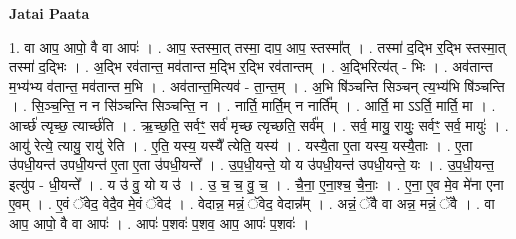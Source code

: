 \documentclass[17pt]{extarticle}
\begin{document}
\textbf{Jatai Paata} \newline

1. वा आप॒ आपो॒ वै वा आपः॑ । . आप॒ स्तस्मा॒त् तस्मा॒ दाप॒ आप॒ स्तस्मा᳚त् । . तस्मा॑ द॒द्भि र॒द्भि स्तस्मा॒त् तस्मा॑ द॒द्भिः । . अ॒द्भि रव॑तान्त॒ मव॑तान्त म॒द्भि र॒द्भि रव॑तान्तम् । . अ॒द्भिरित्य॑त् - भिः । . अव॑तान्त म॒भ्य॑भ्य व॑तान्त॒ मव॑तान्त म॒भि । . अव॑तान्त॒मित्यव॑ - ता॒न्त॒म् । . अ॒भि षि॑ञ्चन्ति सिञ्चन् त्य॒भ्य॑भि षि॑ञ्चन्ति । . सि॒ञ्च॒न्ति॒ न न सि॑ञ्चन्ति सिञ्चन्ति॒ न । . नार्ति॒ मार्ति॒म् न नार्ति᳚म् । . आर्ति॒ मा ऽऽर्ति॒ मार्ति॒ मा । . आर्च्छ॑ त्यृच्छ॒ त्यार्च्छ॑ति । . ऋ॒च्छ॒ति॒ सर्वꣳ॒॒ सर्व॑ मृच्छ त्यृच्छति॒ सर्व᳚म् । . सर्व॒ मायु॒ रायुः॒ सर्वꣳ॒॒ सर्व॒ मायुः॑ । . आयु॑ रेत्ये॒ त्यायु॒ रायु॑ रेति । . ए॒ति॒ यस्य॒ यस्यै᳚ त्येति॒ यस्य॑ । . यस्यै॒ता ए॒ता यस्य॒ यस्यै॒ताः । . ए॒ता उ॑पधी॒यन्त॑ उपधी॒यन्त॑ ए॒ता ए॒ता उ॑पधी॒यन्ते᳚ । . उ॒प॒धी॒यन्ते॒ यो य उ॑पधी॒यन्त॑ उपधी॒यन्ते॒ यः । . उ॒प॒धी॒यन्त॒ इत्यु॑प - धी॒यन्ते᳚ । . य उ॑ वु॒ यो य उ॑ । . उ॒ च॒ च॒ वु॒ च॒ । . चै॒ना॒ ए॒ना॒श्च॒ चै॒नाः॒ । . ए॒ना॒ ए॒व मे॒व मे॑ना एना ए॒वम् । . ए॒वं ॅवेद॒ वेदै॒व मे॒वं ॅवेद॑ । . वेदान्न॒ मन्नं॒ ॅवेद॒ वेदान्न᳚म् । . अन्नं॒ ॅवै वा अन्न॒ मन्नं॒ ॅवै । . वा आप॒ आपो॒ वै वा आपः॑ । . आपः॑ प॒शवः॑ प॒शव॒ आप॒ आपः॑ प॒शवः॑ । \newline
\end{document}
